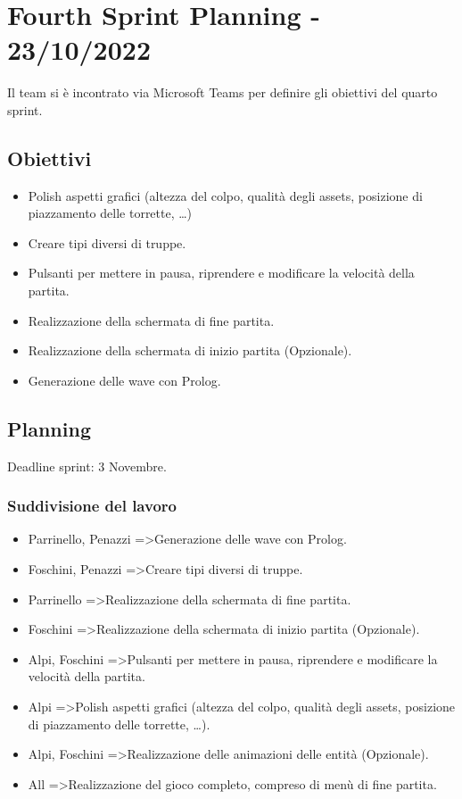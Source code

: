\section{Fourth Sprint Planning - 23/10/2022}
Il team si è incontrato via Microsoft Teams per definire gli obiettivi del quarto sprint.

\subsection{Obiettivi}
\begin{itemize}
    \item Polish aspetti grafici (altezza del colpo, qualità degli assets, posizione di piazzamento delle torrette, \ldots)
    \item Creare tipi diversi di truppe.
    \item Pulsanti per mettere in pausa, riprendere e modificare la velocità della partita.
    \item Realizzazione della schermata di fine partita.
    \item Realizzazione della schermata di inizio partita (Opzionale).
    \item Generazione delle wave con Prolog.
\end{itemize}

\subsection{Planning}
Deadline sprint: 3 Novembre.

\subsubsection{Suddivisione del lavoro}
\begin{itemize}
    \item Parrinello, Penazzi =\textgreater  Generazione delle wave con Prolog.
    \item Foschini, Penazzi =\textgreater  Creare tipi diversi di truppe.
    \item Parrinello =\textgreater  Realizzazione della schermata di fine partita.
    \item Foschini =\textgreater  Realizzazione della schermata di inizio partita (Opzionale).
    \item Alpi, Foschini =\textgreater  Pulsanti per mettere in pausa, riprendere e modificare la velocità della partita.
    \item Alpi =\textgreater  Polish aspetti grafici (altezza del colpo, qualità degli assets, posizione di piazzamento delle torrette, \ldots).
    \item Alpi, Foschini =\textgreater  Realizzazione delle animazioni delle entità (Opzionale).
    \item All =\textgreater  Realizzazione del gioco completo, compreso di menù di fine partita.
\end{itemize}

